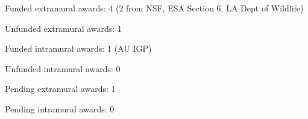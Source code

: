\begin{veryTightItemize}
    \item Funded extramural awards: 4 (2 from NSF, ESA Section 6, LA Dept of Wildlife)
    \item Unfunded extramural awards: 1
    \item Funded intramural awards: 1 (AU IGP)
    \item Unfunded intramural awards: 0
    \item Pending extramural awards: 1
    \item Pending intramural awards: 0
\end{veryTightItemize}
